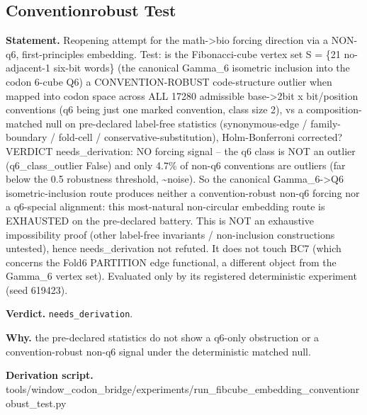 \subsection{Conventionrobust Test}\label{sec:bridge-conventionrobust-test}
\textbf{Statement.} Reopening attempt for the math->bio forcing direction via a NON-q6, first-principles embedding.
Test: is the Fibonacci-cube vertex set S = \{21 no-adjacent-1 six-bit words\} (the canonical
Gamma\_6 isometric inclusion into the codon 6-cube Q6) a CONVENTION-ROBUST code-structure outlier
when mapped into codon space across ALL 17280 admissible base->2bit x bit/position conventions (q6
being just one marked convention, class size 2), vs a composition-matched null on pre-declared
label-free statistics (synonymous-edge / family-boundary / fold-cell / conservative-substitution),
Holm-Bonferroni corrected? VERDICT needs\_derivation: NO forcing signal -- the q6 class is NOT an
outlier (q6\_class\_outlier False) and only 4.7\% of non-q6 conventions are outliers (far below the
0.5 robustness threshold, \textasciitilde{}noise). So the canonical Gamma\_6->Q6 isometric-inclusion
route produces neither a convention-robust non-q6 forcing nor a q6-special alignment: this
most-natural non-circular embedding route is EXHAUSTED on the pre-declared battery. This is NOT an
exhaustive impossibility proof (other label-free invariants / non-inclusion constructions untested),
hence needs\_derivation not refuted. It does not touch BC7 (which concerns the Fold6 PARTITION edge
functional, a different object from the Gamma\_6 vertex set). Evaluated only by its registered
deterministic experiment (seed 619423).

\textbf{Verdict.} \texttt{needs\_derivation}.

\textbf{Why.} the pre-declared statistics do not show a q6-only obstruction or a convention-robust non-q6 signal
under the deterministic matched null.

\textbf{Derivation script.} tools/window\_codon\_bridge/experiments/run\_fibcube\_embedding\_conventionrobust\_test.py

